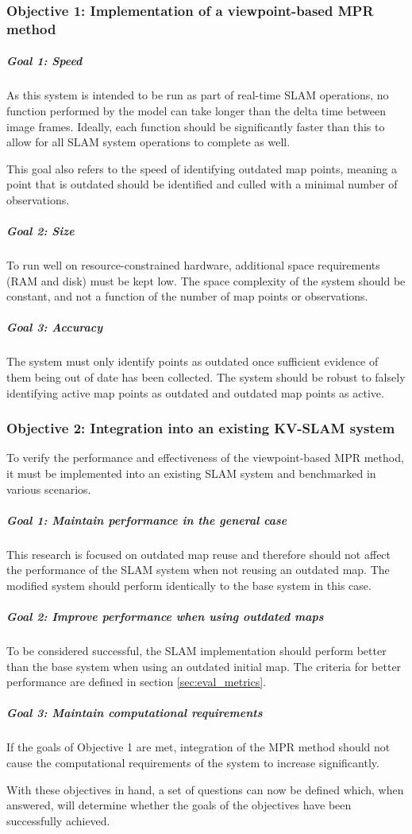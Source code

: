 \subsubsection*{Objective 1: Implementation of a viewpoint-based MPR method}
\label{sec:objective_1}
\subparagraph{Goal 1: Speed}

As this system is intended to be run as part of real-time SLAM operations, no function performed by the model can take longer than the delta time between image frames. Ideally, each function should be significantly faster than this to allow for all SLAM system operations to complete as well.

This goal also refers to the speed of identifying outdated map points, meaning a point that is outdated should be identified and culled with a minimal number of observations.

\subparagraph{Goal 2: Size}

To run well on resource-constrained hardware, additional space requirements (RAM and disk) must be kept low. The space complexity of the system should be constant, and not a function of the number of map points or observations.

\subparagraph{Goal 3: Accuracy}

The system must only identify points as outdated once sufficient evidence of them being out of date has been collected. The system should be robust to falsely identifying active map points as outdated and outdated map points as active.

\subsubsection*{Objective 2: Integration into an existing KV-SLAM system}

To verify the performance and effectiveness of the viewpoint-based MPR method, it must be implemented into an existing SLAM system and benchmarked in various scenarios.

\subparagraph{Goal 1: Maintain performance in the general case}

This research is focused on outdated map reuse and therefore should not affect the performance of the SLAM system when not reusing an outdated map. The modified system should perform identically to the base system in this case.

\subparagraph{Goal 2: Improve performance when using outdated maps}

To be considered successful, the SLAM implementation should perform better than the base system when using an outdated initial map. The criteria for better performance are defined in section \ref{sec:eval_metrics}.

\subparagraph{Goal 3: Maintain computational requirements}

If the goals of Objective 1 are met, integration of the MPR method should not cause the computational requirements of the system to increase significantly.

\bigskip
\noindent With these objectives in hand, a set of questions can now be defined which, when answered, will determine whether the goals of the objectives have been successfully achieved.
